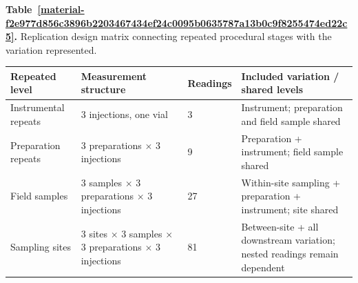 \documentclass[11pt,a4paper]{article}
\newcounter{scripttable}
\begin{document}
\par\medskip
{}
\label{material-f2e977d856c3896b2203467434ef24c0095b0635787a13b0c9f8255474ed22c5}
\noindent\textbf{Table~\ref*{material-f2e977d856c3896b2203467434ef24c0095b0635787a13b0c9f8255474ed22c5}.} Replication design matrix connecting repeated procedural stages with the variation represented.\par\nopagebreak
\begin{longtable}{@{}p{}p{}p{}p{}@{}}
Repeated level & Measurement structure & Readings & Included variation / shared levels \\ \hline
\endhead
Instrumental repeats & 3 injections, one vial & 3 & Instrument; preparation and field sample shared \\ \hline
Preparation repeats & 3 preparations \ensuremath{\times} 3 injections & 9 & Preparation + instrument; field sample shared \\ \hline
Field samples & 3 samples \ensuremath{\times} 3 preparations \ensuremath{\times} 3 injections & 27 & Within-site sampling + preparation + instrument; site shared \\ \hline
Sampling sites & 3 sites \ensuremath{\times} 3 samples \ensuremath{\times} 3 preparations \ensuremath{\times} 3 injections & 81 & Between-site + all downstream variation; nested readings remain dependent \\ \hline
\end{longtable}
\medskip
\end{document}
